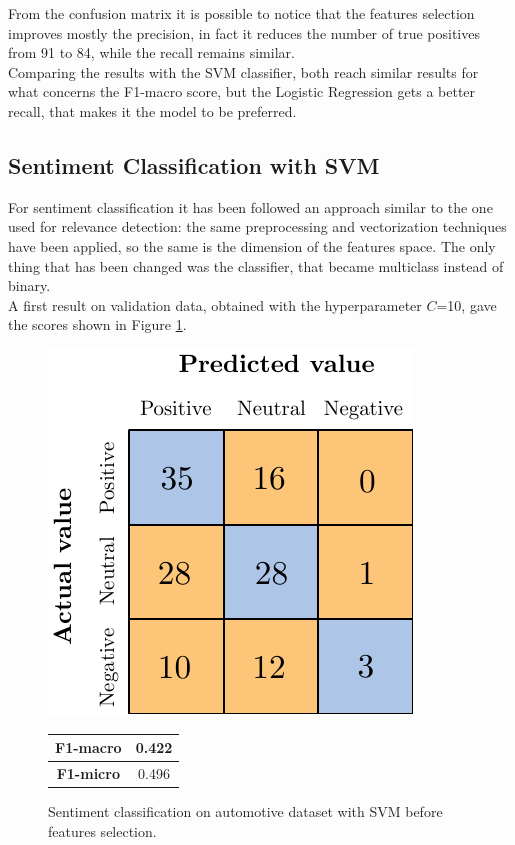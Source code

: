 From the confusion matrix it is possible to notice that the features selection improves mostly the precision, in fact it reduces the number of true positives from 91 to 84, while the recall remains similar.\\
Comparing the results with the SVM classifier, both reach similar results for what concerns the F1-macro score, but the Logistic Regression gets a better recall, that makes it the model to be preferred.



\subsection{Sentiment Classification with SVM}

For sentiment classification it has been followed an approach similar to the one used for relevance detection: the same preprocessing and vectorization techniques have been applied, so the same is the dimension of the features space. The only thing that has been changed was the classifier, that became multiclass instead of binary. \\
A first result on validation data, obtained with the hyperparameter $C$=10, gave the scores shown in Figure \ref{fig:ita_snt_svm_bfs}.

\begin{figure}[H]
	\begin{minipage}[b]{0.6\linewidth}
		\centering
		\includegraphics[scale=1]{figures/conf_matrices/ita_snt_svm/ita_snt_svm_bfs.pdf}
	\end{minipage}
	\begin{minipage}[b]{0.3\linewidth}
		\begin{tabular}[b]{ | c | c | } 
			\hline
			\textbf{F1-macro} & 0.422 \\
			\hline
			\textbf{F1-micro} & 0.496 \\ 
			\hline
		\end{tabular}
	\end{minipage}
	\caption{Sentiment classification on automotive dataset with SVM before features selection.}
	\label{fig:ita_snt_svm_bfs}
\end{figure}


